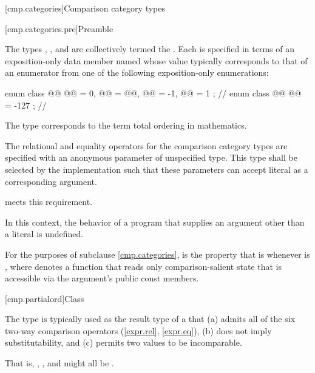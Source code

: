 [cmp.categories]{Comparison category types}

[cmp.categories.pre]{Preamble}

\pnum
The types
,
, and
are collectively termed the .
Each is specified in terms of an exposition-only data member named 
whose value typically corresponds to that of an enumerator
from one of the following exposition-only enumerations:
\begin{codeblock}
enum class @@ { @@ = 0, @@ = @@, @@ = -1, @@ = 1 }; // \expos
enum class @@ { @@ = -127 };                                     // \expos
\end{codeblock}

\pnum
\begin{note}
The type 
corresponds to the term
total ordering in mathematics.
\end{note}

\pnum
The relational and equality operators for the comparison category types
are specified with an anonymous parameter of unspecified type.
This type shall be selected by the implementation such that
these parameters can accept literal  as a corresponding argument.
\begin{example}
meets this requirement.
\end{example}
In this context, the behavior of a program that supplies
an argument other than a literal  is undefined.

\pnum
For the purposes of subclause \ref{cmp.categories},
 is the property that  is 
whenever  is ,
where  denotes a function that reads only comparison-salient state
that is accessible via the argument's public const members.

[cmp.partialord]{Class }

\pnum
The  type is typically used
as the result type of a 
that (a) admits all of the six two-way comparison operators (\ref{expr.rel}, \ref{expr.eq}),
(b) does not imply substitutability,
and (c) permits two values to be incomparable.
\begin{footnote}
That is, , , and  might all be .
\end{footnote}

